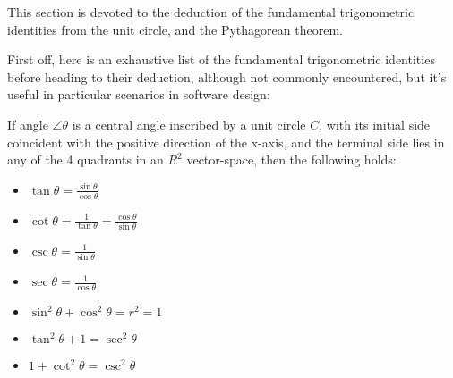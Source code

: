 This section is devoted to the deduction of the fundamental trigonometric identities 
from the unit circle, and the Pythagorean theorem.

First off, here is an exhaustive list of the fundamental trigonometric identities before heading 
to their deduction, although not commonly encountered, but it's useful in particular 
scenarios in software design:

If angle \( \angle{\theta} \) is a central angle inscribed by a unit circle \( C \),
with its initial side coincident with the positive direction of the x-axis, and the 
terminal side lies in any of the 4 quadrants in an \( R^2 \) vector-space, then the following holds:

\begin{itemize}
    \item \( \tan{\theta} = \frac{\sin{\theta}}{\cos{\theta}} \)
    \item \( \cot{\theta} = \frac{1}{\tan{\theta}} = \frac{\cos{\theta}}{\sin{\theta}} \)
    \item \( \csc{\theta} = \frac{1}{\sin{\theta}} \)
    \item \( \sec{\theta} = \frac{1}{\cos{\theta}} \)
    \item \( \sin^2{\theta} + \cos^2{\theta} = r^2 = 1 \)
    \item \( \tan^2{\theta} + 1 = \sec^2{\theta} \)
    \item \( 1 + \cot^2{\theta} = \csc^2{\theta} \)
\end{itemize}

